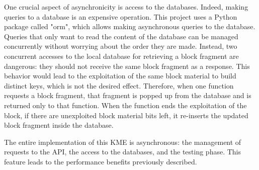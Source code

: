 One crucial aspect of asynchronicity is access to the databases. Indeed, making queries to a database is an expensive operation. This project uses a Python package called "orm", which allows making asynchronous queries to the database. Queries that only want to read the content of the database can be managed concurrently without worrying about the order they are made. Instead, two concurrent accesses to the local database for retrieving a block fragment are dangerous: they should not receive the same block fragment as a response. This behavior would lead to the exploitation of the same block material to build distinct keys, which is not the desired effect. Therefore, when one function requests a block fragment, that fragment is popped up from the database and is returned only to that function. When the function ends the exploitation of the block, if there are unexploited block material bits left, it re-inserts the updated block fragment inside the database.

The entire implementation of this KME is asynchronous: the management of requests to the API, the access to the databases, and the testing phase. This feature leads to the performance benefits previously described.